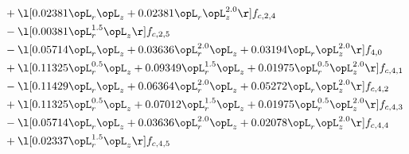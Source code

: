 \begin{alignat}{2}
& + \l[  0.02381 \opL_r \opL_z +  0.02381 \opL_r \opL_z^{2.0}  \r] f_{c,2,4} \nonumber \\ 
& - \l[  0.00381 \opL_r^{1.5} \opL_z  \r] f_{c,2,5} \nonumber \\ 
& - \l[  0.05714 \opL_r \opL_z +  0.03636 \opL_r^{2.0} \opL_z +  0.03194 \opL_r \opL_z^{2.0}  \r] f_{4,0} \nonumber \\ 
& + \l[  0.11325 \opL_r^{0.5} \opL_z +  0.09349 \opL_r^{1.5} \opL_z +  0.01975 \opL_r^{0.5} \opL_z^{2.0}  \r] f_{c,4,1} \nonumber \\ 
& - \l[  0.11429 \opL_r \opL_z +  0.06364 \opL_r^{2.0} \opL_z +  0.05272 \opL_r \opL_z^{2.0}  \r] f_{c,4,2} \nonumber \\ 
& + \l[  0.11325 \opL_r^{0.5} \opL_z +  0.07012 \opL_r^{1.5} \opL_z +  0.01975 \opL_r^{0.5} \opL_z^{2.0}  \r] f_{c,4,3} \nonumber \\ 
& - \l[  0.05714 \opL_r \opL_z +  0.03636 \opL_r^{2.0} \opL_z +  0.02078 \opL_r \opL_z^{2.0}  \r] f_{c,4,4} \nonumber \\ 
& + \l[  0.02337 \opL_r^{1.5} \opL_z  \r] f_{c,4,5} \nonumber \\ 
\end{alignat} 


